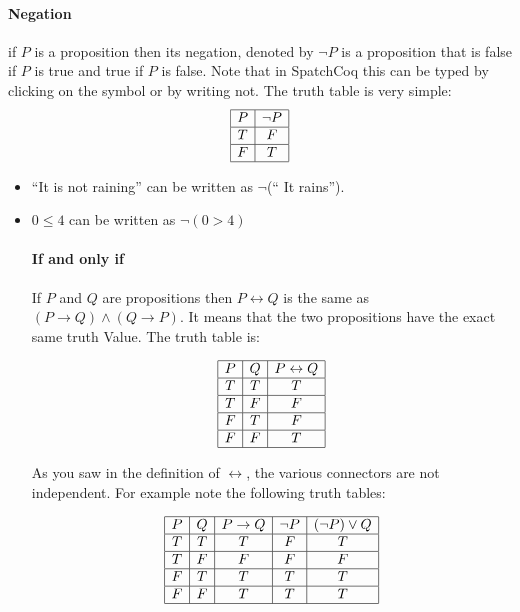 \paragraph{\bf Negation}
if $P$ is a proposition then its negation, denoted by $\neg P$  is a proposition that is  false if  $P$ is true and true if $P$ is false. Note that in SpatchCoq this can be typed by clicking on the symbol or by writing not.
The truth table is very simple:
$$\begin{array}{|c|c|}\hline P & \neg P\\\hline T & F \\\hline F & T\\ \hline\end{array}$$



\begin{itemize}
\item ``It is not raining'' can be written as $\neg$(`` It rains'').
\item $0\le 4$ can be  written as $\neg (0>4)$ 



\paragraph{\bf If and only if}

If $P$ and $Q$ are propositions then $P\leftrightarrow Q$ is the same as $(P\rightarrow Q) \land (Q\rightarrow P)$. It means that the two propositions have the exact same truth Value. The truth table is:

$$\begin{array}{|c|c|c|}\hline P & Q & P\leftrightarrow Q \\\hline T & T & T \\\hline T & F & F \\\hline F & T & F \\\hline F & F & T\\ \hline\end{array}$$


As you saw in the definition of $\leftrightarrow$, the various connectors are not independent. For example note the following truth tables:

$$\begin{array}{|c|c|c|c|c|}\hline P & Q & P\rightarrow Q & \neg P & (\neg P)\lor Q \\ \hline T & T & T &F &T\\\hline T & F & F &F &F \\\hline F & T & T &T &T \\\hline F & F & T &T&T\\ \hline\end{array}$$



\end{itemize}
